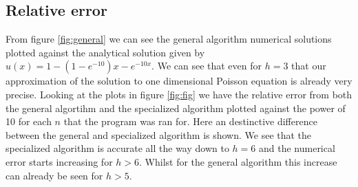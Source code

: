 \documentclass[10pt, a4paper]{amsart}
\begin{document}
\subsection{Relative error}
From figure \ref{fig:general} we can see the general algorithm numerical solutions plotted against the analytical solution given by $u(x) = 1-(1-e^{-10})x-e^{-10x}$. We can see that even for $h=3$ that our approximation of the solution to one dimensional Poisson equation is already very precise. Looking at the plots in figure \ref{fig:fig} we have the relative error from both the general algortihm and the specialized algorithm plotted against the power of 10 for each $n$ that the program was ran for. Here an destinctive difference between the general and specialized algorithm is shown. We see that the specialized algorithm is accurate all the way down to $h=6$ and the numerical error starts increasing for $h>6$. Whilst for the general algorithm this increase can already be seen for $h>5$. 
\end{document}
